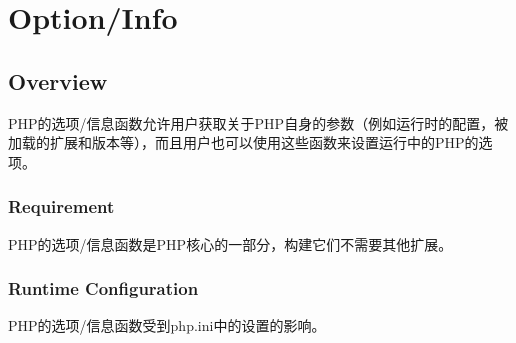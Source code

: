 \part{Option/Info}

\chapter{Overview}


PHP的选项/信息函数允许用户获取关于PHP自身的参数（例如运行时的配置，被加载的扩展和版本等），而且用户也可以使用这些函数来设置运行中的PHP的选项。


\section{Requirement}


PHP的选项/信息函数是PHP核心的一部分，构建它们不需要其他扩展。

\section{Runtime Configuration}

PHP的选项/信息函数受到php.ini中的设置的影响。


